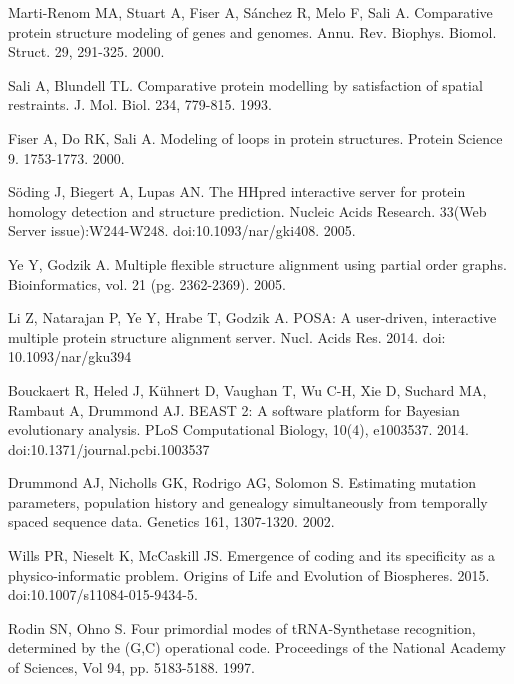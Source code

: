 \documentclass[10pt,letterpaper]{article}
\begin{document}
\begin{thebibliography}{10}
% 
Marti-Renom MA, Stuart A, Fiser A, Sánchez R, Melo F, Sali A. 
\newblock Comparative protein structure modeling of genes and genomes.
\newblock Annu. Rev. Biophys. Biomol. Struct. 29, 291-325. 2000.

%
Sali A, Blundell TL.
\newblock Comparative protein modelling by satisfaction of spatial restraints.
\newblock J. Mol. Biol. 234, 779-815. 1993.

% 
Fiser A, Do RK, Sali A.
\newblock Modeling of loops in protein structures.
\newblock Protein Science 9. 1753-1773. 2000.

Söding J, Biegert A, Lupas AN.
\newblock The HHpred interactive server for protein homology detection and structure prediction. 
\newblock Nucleic Acids Research. 33(Web Server issue):W244-W248. doi:10.1093/nar/gki408. 2005.

Ye Y, Godzik A.
\newblock Multiple flexible structure alignment using partial order graphs.
\newblock Bioinformatics, vol. 21 (pg. 2362-2369). 2005.

Li Z, Natarajan P, Ye Y, Hrabe T, Godzik A.
\newblock POSA: A user-driven, interactive multiple protein structure alignment server.
\newblock Nucl. Acids Res. 2014. doi: 10.1093/nar/gku394

Bouckaert R, Heled J, Kühnert D, Vaughan T, Wu C-H, Xie D, Suchard MA, Rambaut A, Drummond AJ.
\newblock BEAST 2: A software platform for Bayesian evolutionary analysis.
\newblock PLoS Computational Biology, 10(4), e1003537. 2014. doi:10.1371/journal.pcbi.1003537

Drummond AJ, Nicholls GK, Rodrigo AG, Solomon S. 
\newblock Estimating mutation parameters, population history and genealogy simultaneously from temporally spaced sequence data.
\newblock Genetics 161, 1307-1320. 2002.

Wills PR, Nieselt K, McCaskill JS.
\newblock Emergence of coding and its specificity as a physico-informatic problem.
\newblock Origins of Life and Evolution of Biospheres. 2015. doi:10.1007/s11084-015-9434-5.

Rodin SN, Ohno S.
\newblock Four primordial modes of tRNA-Synthetase recognition, determined by the (G,C) operational code.
\newblock Proceedings of the National Academy of Sciences, Vol 94, pp. 5183-5188. 1997.


\end{thebibliography}
\end{document}
